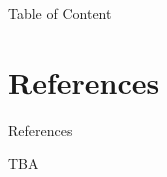 \documentclass[
 rgb,
 size=14pt,
 paper=smartboard, %
 mode=present, %
 display=slides, %
 style=tuliplab,  %
 pauseslide,
 fleqn,leqno]{powerdot}
\begin{document}
\maketitle 

\begin{slide}[toc=,bm=]{Table of Content}
 \tableofcontents[type=1,content=futuresections]
\end{slide}





\section{References}

\begin{slide}[toc=,bm=]
	{References}

\footnotesize

\end{slide}
\begin{note}
	TBA
\end{note}



%

%
\end{document}
